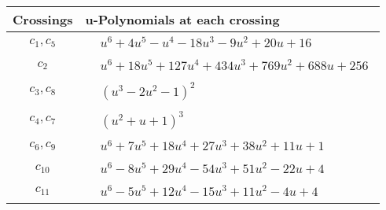\documentclass[1p]{elsarticle_modified}
\theoremstyle{definition}
\begin{document}
\begin{tabular}{m{50pt}|m{274pt}}
Crossings & \hspace{64pt}u-Polynomials at each crossing \\
\hline $$\begin{aligned}c_{1},c_{5}\end{aligned}$$&$\begin{aligned}
&u^6+4 u^5- u^4-18 u^3-9 u^2+20 u+16
\end{aligned}$\\
\hline $$\begin{aligned}c_{2}\end{aligned}$$&$\begin{aligned}
&u^6+18 u^5+127 u^4+434 u^3+769 u^2+688 u+256
\end{aligned}$\\
\hline $$\begin{aligned}c_{3},c_{8}\end{aligned}$$&$\begin{aligned}
&(u^3-2 u^2-1)^2
\end{aligned}$\\
\hline $$\begin{aligned}c_{4},c_{7}\end{aligned}$$&$\begin{aligned}
&(u^2+u+1)^3
\end{aligned}$\\
\hline $$\begin{aligned}c_{6},c_{9}\end{aligned}$$&$\begin{aligned}
&u^6+7 u^5+18 u^4+27 u^3+38 u^2+11 u+1
\end{aligned}$\\
\hline $$\begin{aligned}c_{10}\end{aligned}$$&$\begin{aligned}
&u^6-8 u^5+29 u^4-54 u^3+51 u^2-22 u+4
\end{aligned}$\\
\hline $$\begin{aligned}c_{11}\end{aligned}$$&$\begin{aligned}
&u^6-5 u^5+12 u^4-15 u^3+11 u^2-4 u+4
\end{aligned}$\\
\hline
\end{tabular}\\~\\
\newpage\renewcommand{\arraystretch}{1}
\end{document}
